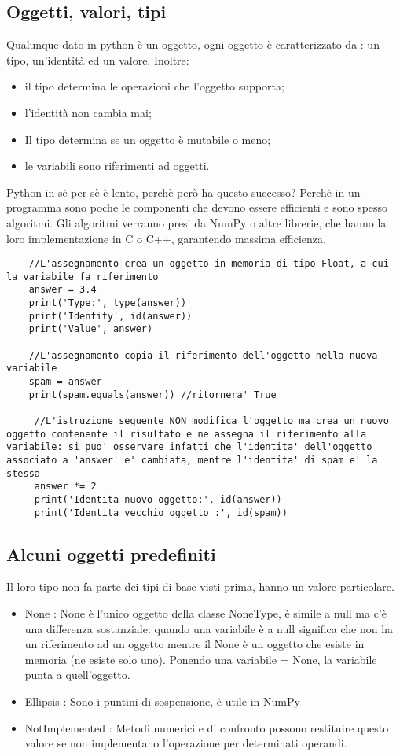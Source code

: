 \subsection{Oggetti, valori, tipi}

Qualunque dato in python è un oggetto, ogni oggetto è caratterizzato da : un tipo, un'identità ed un valore.
Inoltre:
\begin{itemize}
	\item il tipo determina le operazioni che l'oggetto supporta;
	\item l'identità non cambia mai;
	\item Il tipo determina se un oggetto è mutabile o meno;
	\item le variabili sono riferimenti ad oggetti.
\end{itemize}
Python in sè per sè è lento, perchè però ha questo successo? Perchè in un programma sono poche le componenti che devono essere efficienti e sono spesso algoritmi. Gli algoritmi verranno presi da NumPy o altre librerie, che hanno la loro implementazione in C o C++, garantendo massima efficienza.

\begin{lstlisting}
	//L'assegnamento crea un oggetto in memoria di tipo Float, a cui la variabile fa riferimento
	answer = 3.4
	print('Type:', type(answer))
	print('Identity', id(answer))
	print('Value', answer)
	
	//L'assegnamento copia il riferimento dell'oggetto nella nuova variabile
	spam = answer
	print(spam.equals(answer)) //ritornera' True
	
	 //L'istruzione seguente NON modifica l'oggetto ma crea un nuovo oggetto contenente il risultato e ne assegna il riferimento alla variabile: si puo' osservare infatti che l'identita' dell'oggetto associato a 'answer' e' cambiata, mentre l'identita' di spam e' la stessa
	 answer *= 2
	 print('Identita nuovo oggetto:', id(answer))
	 print('Identita vecchio oggetto :', id(spam))
\end{lstlisting}

\subsection{Alcuni oggetti predefiniti}

Il loro tipo non fa parte dei tipi di base visti prima, hanno un valore particolare.

\begin{itemize}
	\item None : None è l'unico oggetto della classe NoneType, è simile a null ma c'è una differenza sostanziale: quando una variabile è a null significa che non ha un riferimento ad un oggetto mentre il None è un oggetto che esiste in memoria (ne esiste solo uno). Ponendo una variabile = None, la variabile punta a quell'oggetto.
	\item Ellipsis : Sono i puntini di sospensione, è utile in NumPy
	\item NotImplemented : Metodi numerici e di confronto possono restituire questo valore se non implementano l'operazione per determinati operandi.	
\end{itemize}

